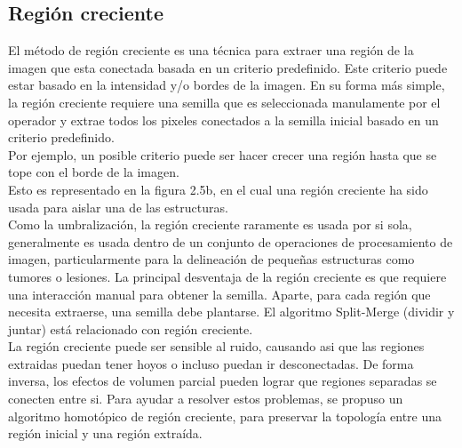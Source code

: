 \documentclass[12pt]{report}
\begin{document}
\subsection{Región creciente}
El método de región creciente es una técnica para extraer una región de la imagen que esta conectada basada en un criterio predefinido. Este criterio puede estar basado en la intensidad y/o bordes de la imagen. En su forma más simple, la región creciente requiere una semilla que es seleccionada manulamente por el operador y extrae todos los pixeles conectados a la semilla inicial basado en un criterio predefinido.\\

Por ejemplo, un posible criterio puede ser hacer crecer una región hasta que se tope con el borde de la imagen.\\

Esto es representado en la figura 2.5b, en el cual una región creciente ha sido usada para aislar una de las estructuras.\\

Como la umbralización, la región creciente raramente es usada por si sola, generalmente es usada dentro de un conjunto de operaciones de procesamiento de imagen, particularmente para la delineación de pequeñas estructuras como tumores o lesiones. La principal desventaja de la región creciente es que requiere una interacción manual para obtener la semilla. Aparte, para cada región que necesita extraerse, una semilla debe plantarse. El algoritmo Split-Merge (dividir y juntar) está relacionado con región creciente.\\

La región creciente puede ser sensible al ruido, causando asi que las regiones extraidas puedan tener hoyos o incluso puedan ir desconectadas. De forma inversa, los efectos de volumen parcial pueden lograr que regiones separadas se conecten entre si. Para ayudar a resolver estos problemas, se propuso un algoritmo homotópico de región creciente, para preservar la topología entre una región inicial y una región extraída.
\end{document}
